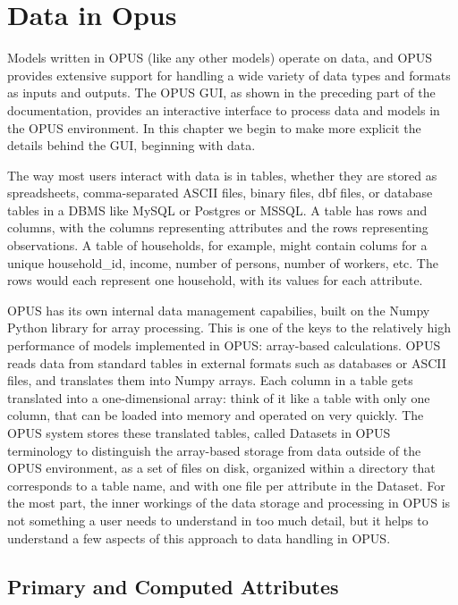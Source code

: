 \chapter{Data in Opus}
\label{chap:data-in-opus}

Models written in OPUS (like any other models) operate on data, and OPUS provides extensive support for handling a wide variety of data types and formats as inputs and outputs. 
The OPUS GUI, as shown in the preceding part of the documentation, provides an interactive interface to process data and models in the OPUS environment.  In this chapter we begin
to make more explicit the details behind the GUI, beginning with data.

The way most users interact with data is in tables, whether they are stored as spreadsheets, comma-separated ASCII files, binary files, dbf files, or database tables in a DBMS like MySQL or Postgres or MSSQL\@.  A table has rows and columns, with the columns representing attributes and the rows representing observations.  A table of households, for example, might contain colums for a unique household_id, income, number of persons, number of workers, etc.  The rows would each represent one household, with its values for each attribute.

OPUS has its own internal data management capabilies, built on the Numpy Python library for array processing.  This is one of the keys to the relatively high performance of models implemented in OPUS: array-based calculations.  OPUS reads data from standard tables in external formats such as databases or ASCII files, and translates them into Numpy arrays.  Each column in a table gets translated into a one-dimensional array: think of it like a table with only one column, that can be loaded into memory and operated on very quickly.  The OPUS system stores these translated tables, called Datasets in OPUS terminology to distinguish the array-based storage from data outside of the OPUS environment, as a set of files on disk, organized within a directory that corresponds to a table name, and with one file per attribute in the Dataset.  For the most part, the inner workings of the data storage and processing in OPUS is not something a user needs to understand in too much detail, but it helps to understand a few aspects of this approach to data handling in OPUS.

\section{Primary and Computed Attributes}

